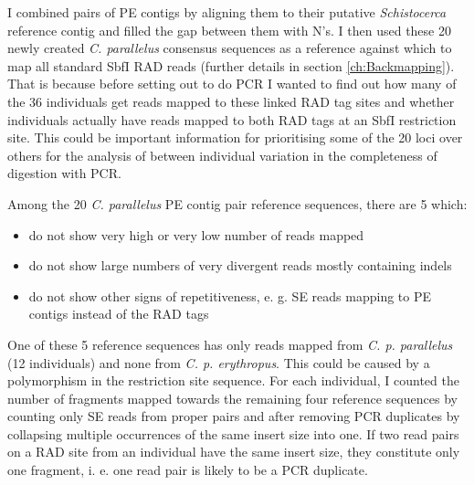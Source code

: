 \documentclass[a4paper,12pt,times,print,index,custombib,custommargin]{PhDThesisPSnPDF}\usepackage[]{graphicx}\usepackage[]{color}
\begin{document}
I combined pairs of PE contigs by aligning them to their putative \textit{Schistocerca} reference contig and filled the gap between them with N's. I then used these 20 newly created \textit{C. parallelus} consensus sequences as a reference against which to map all standard SbfI RAD reads (further details in section \ref{ch:Backmapping}). That is because before setting out to do PCR I wanted to find out how many of the 36 individuals get reads mapped to these \glspl{linked RAD tag site} and whether individuals actually have reads mapped to both \glspl{RAD tag} at an SbfI restriction site. This could be important information for prioritising some of the 20 loci over others for the analysis of between individual variation in the completeness of digestion with PCR.

Among the 20 \textit{C. parallelus} PE contig pair reference sequences, there are 5 which:

\begin{itemize}
\item do not show very high or very low number of reads mapped
\item do not show large numbers of very divergent reads mostly containing \glspl{indel}
\item do not show other signs of repetitiveness, e. g. SE reads mapping to PE contigs instead of the \glspl{RAD tag}
\end{itemize}

One of these 5 reference sequences has only reads mapped from \textit{C. p. parallelus} (12 individuals) and none from \textit{C. p. erythropus}. This could be caused by a polymorphism in the restriction site sequence. For each individual, I counted the number of \glspl{fragment} mapped towards the remaining four reference sequences by counting only SE reads from \glspl{proper pair} and after removing PCR duplicates by collapsing multiple occurrences of the same insert size into one. If two read pairs on a RAD site from an individual have the same insert size, they constitute only one fragment, i. e. one read pair is likely to be a PCR duplicate. 
\end{document}
